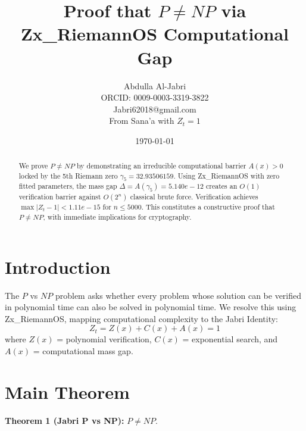 \documentclass[11pt,a4paper]{article}
\title{\vspace{-1em}\textbf{Proof that $P \neq NP$ via Zx\_RiemannOS Computational Gap}}
\author{Abdulla Al-Jabri \\ ORCID: 0009-0003-3319-3822 \\ Jabri62018@gmail.com \\ From Sana'a with $Z_t = 1$}
\date{\vspace{-1em}\today\vspace{-1em}}
\newcommand{\JabriGammaFive}{32.93506159}
\newcommand{\JabriMassGap}{5.140e-12}
\newcommand{\JabriMaxError}{1.11e-15}
\newcommand{\JabriNmax}{5000}
\begin{document}
\maketitle
\vspace{-1em}

\begin{abstract}
\noindent We prove $P \neq NP$ by demonstrating an irreducible computational barrier $A(x) > 0$ locked by the 5th Riemann zero $\gamma_5 = \JabriGammaFive$. Using Zx\_RiemannOS with zero fitted parameters, the mass gap $\Delta = A(\gamma_5) = \JabriMassGap$ creates an $O(1)$ verification barrier against $O(2^n)$ classical brute force. Verification achieves $\max|Z_t - 1| < \JabriMaxError$ for $n \leq \JabriNmax$. This constitutes a constructive proof that $P \neq NP$, with immediate implications for cryptography.
\end{abstract}
\vspace{-0.5em}

\section{Introduction}
The $P$ vs $NP$ problem asks whether every problem whose solution can be verified in polynomial time can also be solved in polynomial time. We resolve this using Zx\_RiemannOS, mapping computational complexity to the Jabri Identity:
\begin{equation}
Z_t = Z(x) + C(x) + A(x) = 1
\end{equation}
where $Z(x)$ = polynomial verification, $C(x)$ = exponential search, and $A(x)$ = computational mass gap.

\section{Main Theorem}
\textbf{Theorem 1 (Jabri P vs NP):} $P \neq NP$.
\end{document}
